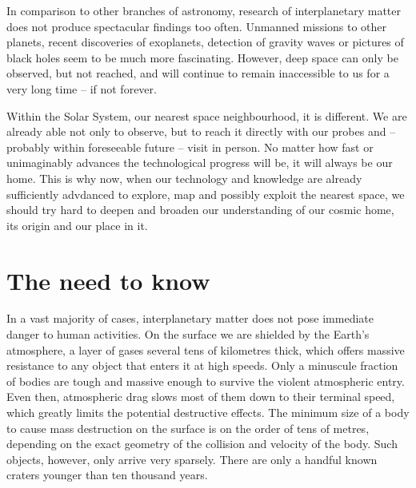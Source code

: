 
In comparison to other branches of astronomy, research of interplanetary matter
does not produce spectacular findings too often.
Unmanned missions to other planets, recent discoveries of exoplanets, detection of gravity waves
or pictures of black holes seem to be much more fascinating.
However, deep space can only be observed, but not reached, and will continue to remain
inaccessible to us for a very long time -- if not forever.

Within the Solar System, our nearest space neighbourhood, it is different. We are already able not only to observe,
but to reach it directly with our probes and -- probably within foreseeable future -- visit in person.
No matter how fast or unimaginably advances the technological progress will be, it will always be our home.
This is why now, when our technology and knowledge are already sufficiently advdanced to explore, map and possibly exploit
the nearest space, we should try hard to deepen and broaden our understanding of our cosmic home, its origin and our place in it.

\section{The need to know} \label{in}
    In a vast majority of cases, interplanetary matter does not pose immediate danger to human activities.
    On the surface we are shielded by the Earth's atmosphere, a layer of gases several tens of kilometres
    thick, which offers massive resistance to any object that enters it at high speeds.
    Only a minuscule fraction of bodies are tough and massive enough to survive the violent atmospheric entry.
    Even then, atmospheric drag slows most of them down to their terminal speed, which greatly limits the potential destructive effects.
    The minimum size of a body to cause mass destruction on the surface is on the order of tens of metres,
    depending on the exact geometry of the collision and velocity of the body. Such objects, however, only arrive very sparsely.
    There are only a handful known craters younger than ten thousand years.


